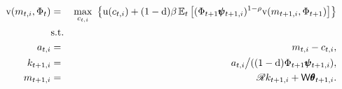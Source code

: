\begin{eqnarray}
    \mathrm{v}({m}_{t,i},\Phi_t) & = & \max_{c_{t,i}} ~ \big\{ {\mathrm{u}}(c_{t,i}) + (1-\mathrm{d}) \beta
    \operatorname{\mathbb{E}}_{t}\big[ (\Phi_{t+1} \pmb{\psi}_{t+1,i})^{1-\rho}\mathrm{v}(m_{t+1,i},\Phi_{t+1})\big] \big\}
    \label{eq:scaledv}
\\  & \mbox{s.t.} & \nonumber
\\    a_{t,i}   & = & m_{t,i} - c_{t,i}, \nonumber
\\    k_{t+1,i} & = & a_{t,i} \big/( (1-\mathrm{d}) \Phi_{t+1} \pmb{\psi}_{t+1,i} ),  \nonumber
\\    m_{t+1,i} & = & \mathscr{R} k_{t+1,i} + \mathsf{W} \pmb{\theta}_{t+1,i}.  \nonumber
\end{eqnarray}
